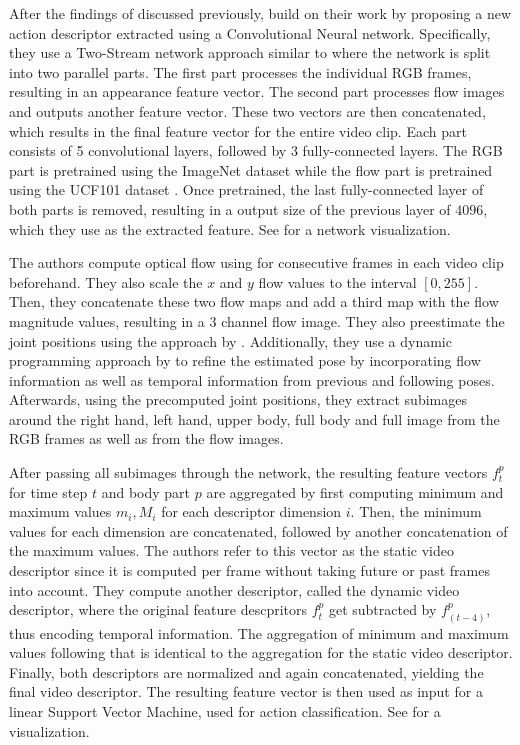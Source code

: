 After the findings of \cite{jhuang_towards_2013} discussed previously, \cite{cheron_pcnn_2015} build on their work by proposing a new action descriptor extracted using a Convolutional Neural network.
Specifically, they use a Two-Stream network approach similar to \cite{simonyan_two-stream_2014} where the network is split into two parallel parts.
The first part processes the individual RGB frames, resulting in an appearance feature vector. 
The second part processes flow images and outputs another feature vector. 
These two vectors are then concatenated, which results in the final feature vector for the entire video clip. 
Each part consists of 5 convolutional layers, followed by 3 fully-connected layers. The RGB part is pretrained using the ImageNet dataset \cite{deng_imagenet:_2009} while the flow part is pretrained using the UCF101 dataset \cite{soomro_ucf101:_2012}. 
Once pretrained, the last fully-connected layer of both parts is removed, resulting in a output size of the previous layer of $4096$, which they use as the extracted feature.
See  for a network visualization.

The authors compute optical flow using \cite{brox_high_2004} for consecutive frames in each video clip beforehand.
They also scale the $x$ and $y$ flow values to the interval $[0, 255]$.
Then, they concatenate these two flow maps and add a third map with the flow magnitude values, resulting in a $3$ channel flow image.
They also preestimate the joint positions using the approach by \cite{yang_articulated_2011}.
Additionally, they use a dynamic programming approach by \cite{cherian_mixing_2014} to refine the estimated pose by incorporating flow information as well as temporal information from previous and following poses.
Afterwards, using the precomputed joint positions, they extract subimages around the right hand, left hand, upper body, full body and full image from the RGB frames as well as from the flow images.

After passing all subimages through the network, the resulting feature vectors $f_t^p$ for time step $t$ and body part $p$ are aggregated by first computing minimum and maximum values $m_i, M_i$ for each descriptor dimension $i$.
Then, the minimum values for each dimension are concatenated, followed by another concatenation of the maximum values.
The authors refer to this vector as the static video descriptor since it is computed per frame without taking future or past frames into account.
They compute another descriptor, called the dynamic video descriptor, where the original feature descpritors $f_t^p$ get subtracted by $f_(t-4)^p$, thus encoding temporal information.
The aggregation of minimum and maximum values following that is identical to the aggregation for the static video descriptor.
Finally, both descriptors are normalized and again concatenated, yielding the final video descriptor.
The resulting feature vector is then used as input for a linear Support Vector Machine, used for action classification.
See  for a visualization.

